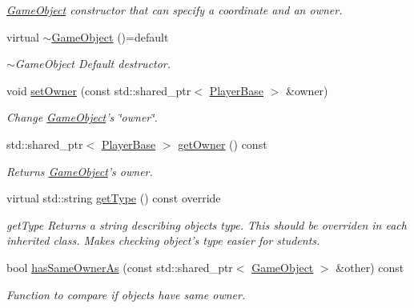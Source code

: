 \begin{DoxyCompactItemize}
\begin{DoxyCompactList}\small\item\em \hyperlink{class_course_1_1_game_object}{Game\-Object} constructor that can specify a coordinate and an owner. \end{DoxyCompactList}\item 
\hypertarget{class_course_1_1_game_object_abfa4185247b43636bf53897a4731a763}{virtual \hyperlink{class_course_1_1_game_object_abfa4185247b43636bf53897a4731a763}{$\sim$\-Game\-Object} ()=default}\label{class_course_1_1_game_object_abfa4185247b43636bf53897a4731a763}

\begin{DoxyCompactList}\small\item\em $\sim$\-Game\-Object Default destructor. \end{DoxyCompactList}\item 
void \hyperlink{class_course_1_1_game_object_ab0bc9a071a6be545e229e8255bff9fd1}{set\-Owner} (const std\-::shared\-\_\-ptr$<$ \hyperlink{class_course_1_1_player_base}{Player\-Base} $>$ \&owner)
\begin{DoxyCompactList}\small\item\em Change \hyperlink{class_course_1_1_game_object}{Game\-Object}'s \char`\"{}owner\char`\"{}. \end{DoxyCompactList}\item 
std\-::shared\-\_\-ptr$<$ \hyperlink{class_course_1_1_player_base}{Player\-Base} $>$ \hyperlink{class_course_1_1_game_object_ad0c27226469c45b63a0f9747b0097aea}{get\-Owner} () const 
\begin{DoxyCompactList}\small\item\em Returns \hyperlink{class_course_1_1_game_object}{Game\-Object}'s owner. \end{DoxyCompactList}\item 
virtual std\-::string \hyperlink{class_course_1_1_game_object_a9a7b36c7f9258af82898190ee6ba7222}{get\-Type} () const override
\begin{DoxyCompactList}\small\item\em get\-Type Returns a string describing objects type. This should be overriden in each inherited class. Makes checking object's type easier for students. \end{DoxyCompactList}\item 
bool \hyperlink{class_course_1_1_game_object_adeccfb311b86ecbcf6e2e35f87e18cc7}{has\-Same\-Owner\-As} (const std\-::shared\-\_\-ptr$<$ \hyperlink{class_course_1_1_game_object}{Game\-Object} $>$ \&other) const 
\begin{DoxyCompactList}\small\item\em Function to compare if objects have same owner. \end{DoxyCompactList}\end{DoxyCompactItemize}

